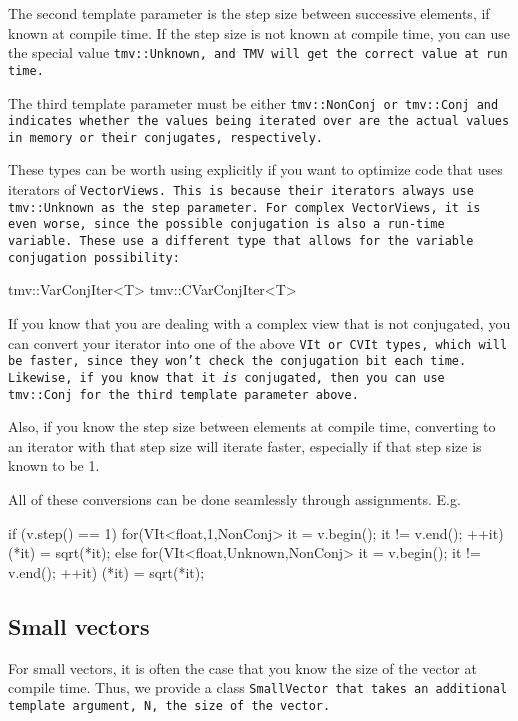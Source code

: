 The second template parameter is the step size between successive elements, if known at compile time.  If the step size is not known at compile time, you can use the special value \tt{tmv::Unknown}, and TMV will get the correct value at run time.  

The third template parameter must be either \tt{tmv::NonConj} or \tt{tmv::Conj} and indicates whether the values being iterated over are the actual values in memory or their conjugates, respectively.

These types can be worth using explicitly if you want to optimize code that uses iterators of \tt{VectorView}s.
This is because their iterators always use \tt{tmv::Unknown} as the step parameter.  For complex \tt{VectorView}s, it is even worse, since the possible conjugation is also a run-time variable.  These use a different type that allows for the variable conjugation possibility:
\begin{tmvcode}
tmv::VarConjIter<T>
tmv::CVarConjIter<T>
\end{tmvcode}
\label{VarConjIter}
\label{CVarConjIter}

If you know that you are dealing with a complex view that is not conjugated, you can 
convert your iterator into one of the above \tt{VIt} or \tt{CVIt} types, which will be 
faster, since they won't check the conjugation bit each time. 
Likewise, if you
know that it {\em is} conjugated, then you can use \tt{tmv::Conj} for the 
third template parameter above.

Also, if you know the step size between elements at compile time, converting to 
an iterator with that step size will iterate faster, especially if that step size is known to be 1.

All of these conversions can be done seamlessly through assignments.  E.g.
\begin{tmvcode}
if (v.step() == 1)
    for(VIt<float,1,NonConj> it = v.begin(); it != v.end(); ++it)
        (*it) = sqrt(*it);
else 
    for(VIt<float,Unknown,NonConj> it = v.begin(); it != v.end(); ++it)
        (*it) = sqrt(*it);
\end{tmvcode}

\subsection{Small vectors}
\label{SmallVector}

For small vectors, it is often the case that you know the size of the vector
at compile time.  Thus, we provide a class \tt{SmallVector} that takes an
additional template argument, \tt{N}, the size of the vector.

